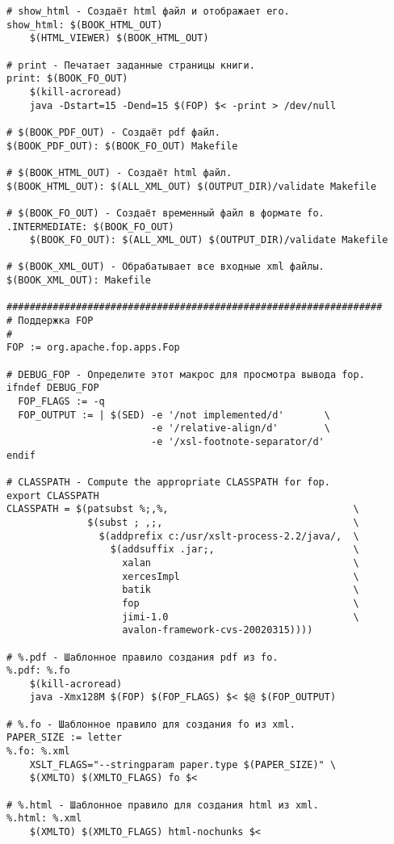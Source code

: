 {\begin{verbatim}
# show_html - Создаёт html файл и отображает его.
show_html: $(BOOK_HTML_OUT)
    $(HTML_VIEWER) $(BOOK_HTML_OUT)

# print - Печатает заданные страницы книги.
print: $(BOOK_FO_OUT)
    $(kill-acroread)
    java -Dstart=15 -Dend=15 $(FOP) $< -print > /dev/null

# $(BOOK_PDF_OUT) - Создаёт pdf файл.
$(BOOK_PDF_OUT): $(BOOK_FO_OUT) Makefile

# $(BOOK_HTML_OUT) - Создаёт html файл.
$(BOOK_HTML_OUT): $(ALL_XML_OUT) $(OUTPUT_DIR)/validate Makefile

# $(BOOK_FO_OUT) - Создаёт временный файл в формате fo.
.INTERMEDIATE: $(BOOK_FO_OUT)
    $(BOOK_FO_OUT): $(ALL_XML_OUT) $(OUTPUT_DIR)/validate Makefile

# $(BOOK_XML_OUT) - Обрабатывает все входные xml файлы.
$(BOOK_XML_OUT): Makefile

#################################################################
# Поддержка FOP
#
FOP := org.apache.fop.apps.Fop

# DEBUG_FOP - Определите этот макрос для просмотра вывода fop.
ifndef DEBUG_FOP
  FOP_FLAGS := -q
  FOP_OUTPUT := | $(SED) -e '/not implemented/d'       \
                         -e '/relative-align/d'        \
                         -e '/xsl-footnote-separator/d'
endif

# CLASSPATH - Compute the appropriate CLASSPATH for fop.
export CLASSPATH
CLASSPATH = $(patsubst %;,%,                                \
              $(subst ; ,;,                                 \
                $(addprefix c:/usr/xslt-process-2.2/java/,  \
                  $(addsuffix .jar;,                        \
                    xalan                                   \
                    xercesImpl                              \
                    batik                                   \
                    fop                                     \
                    jimi-1.0                                \
                    avalon-framework-cvs-20020315))))

# %.pdf - Шаблонное правило создания pdf из fo.
%.pdf: %.fo
    $(kill-acroread)
    java -Xmx128M $(FOP) $(FOP_FLAGS) $< $@ $(FOP_OUTPUT)

# %.fo - Шаблонное правило для создания fo из xml.
PAPER_SIZE := letter
%.fo: %.xml
    XSLT_FLAGS="--stringparam paper.type $(PAPER_SIZE)" \
    $(XMLTO) $(XMLTO_FLAGS) fo $<

# %.html - Шаблонное правило для создания html из xml.
%.html: %.xml
    $(XMLTO) $(XMLTO_FLAGS) html-nochunks $<


\end{verbatim}}
